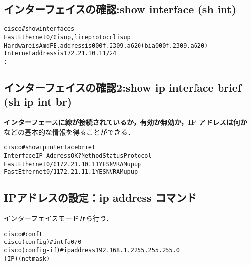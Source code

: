 \subsection*{インターフェイスの確認:show interface (sh int)}

\begin{center}
\begin{screen}
\begin{alltt}
cisco#show interfaces
FastEthernet0/0 is up, line protocol is up
  Hardware is AmdFE, address is 000f.2309.a620 (bia 000f.2309.a620)
  Internet address is 172.21.10.11/24
        :
\end{alltt}
\end{screen}
\end{center}

\subsection*{インターフェイスの確認2:show ip interface brief (sh ip int br)}

\textbf{インターフェースに線が接続されているか，有効か無効か，IP アドレスは何か}などの基本的な情報を得ることができる．

\begin{center}
\begin{screen}
\begin{alltt}
cisco#show ip interface brief
Interface                  IP-Address      OK? Method Status                Protocol
FastEthernet0/0            172.21.10.11    YES NVRAM  up                    up
FastEthernet0/1            172.21.11.1     YES NVRAM  up                    up
\end{alltt}
\end{screen}
\end{center}

\subsection*{IPアドレスの設定：ip address コマンド}
インターフェイスモードから行う．

\begin{center}
\begin{screen}
\begin{alltt}
cisco#conf t
cisco(config)#int fa0/0
cisco(config-if)#ip address 192.168.1.2 255.255.255.0
                              (IP)        (netmask)
\end{alltt}
\end{screen}
\end{center}

